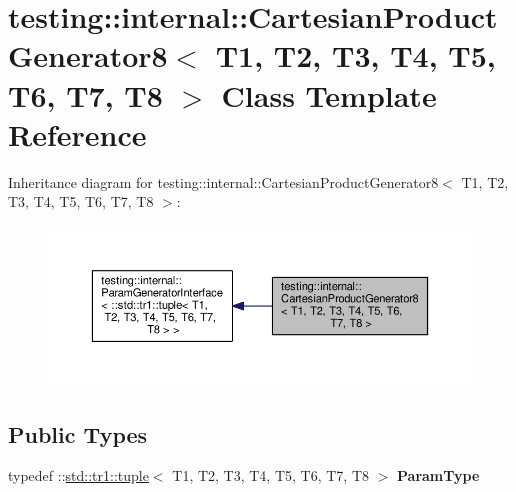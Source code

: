 \hypertarget{classtesting_1_1internal_1_1_cartesian_product_generator8}{}\section{testing\+:\+:internal\+:\+:Cartesian\+Product\+Generator8$<$ T1, T2, T3, T4, T5, T6, T7, T8 $>$ Class Template Reference}
\label{classtesting_1_1internal_1_1_cartesian_product_generator8}


Inheritance diagram for testing\+:\+:internal\+:\+:Cartesian\+Product\+Generator8$<$ T1, T2, T3, T4, T5, T6, T7, T8 $>$\+:
\nopagebreak
\begin{figure}[H]
\begin{center}
\leavevmode
\includegraphics[width=350pt]{classtesting_1_1internal_1_1_cartesian_product_generator8__inherit__graph}
\end{center}
\end{figure}
\subsection*{Public Types}
\begin{DoxyCompactItemize}
\item 
\mbox{\label{classtesting_1_1internal_1_1_cartesian_product_generator8_ac0ce78b904e9a155d0f0711b9012ec0b}} 
typedef \+::\mbox{\hyperlink{classstd_1_1tr1_1_1tuple}{std\+::tr1\+::tuple}}$<$ T1, T2, T3, T4, T5, T6, T7, T8 $>$ {\bfseries Param\+Type}
\end{DoxyCompactItemize}
